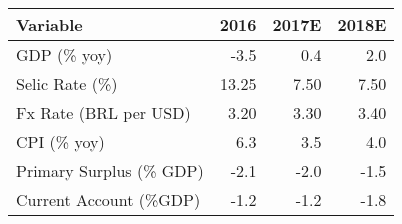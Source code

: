 \documentclass[11pt]{article}
\author{user}
\date{\today}
\title{}
\begin{document}
\begin{center}
\begin{tabular}{lrrr}
\textbf{Variable} & \textbf{2016} & \textbf{2017E} & \textbf{2018E}\\
\hline
\hline
GDP (\% yoy) & -3.5 & 0.4 & 2.0\\
Selic Rate (\%) & 13.25 & 7.50 & 7.50\\
Fx Rate (BRL per USD) & 3.20 & 3.30 & 3.40\\
CPI (\% yoy) & 6.3 & 3.5 & 4.0\\
Primary Surplus (\% GDP) & -2.1 & -2.0 & -1.5\\
Current Account (\%GDP) & -1.2 & -1.2 & -1.8\\
\hline
\end{tabular}
\end{center}
\end{document}
